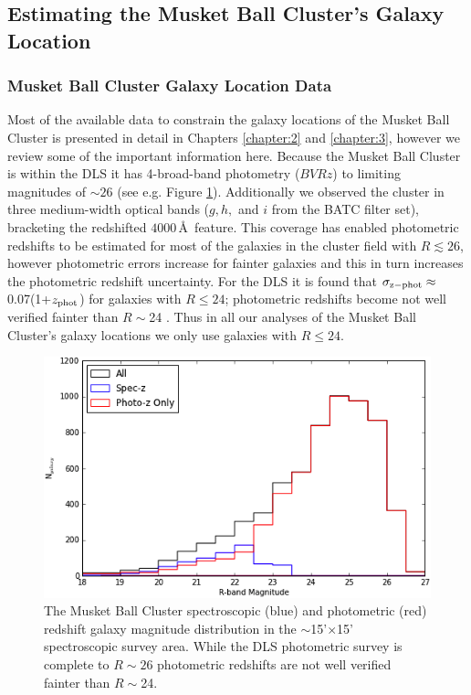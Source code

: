\subsection{Estimating the Musket Ball Cluster's Galaxy Location}

\subsubsection{Musket Ball Cluster Galaxy Location Data}

Most of the available data to constrain the galaxy locations of the Musket Ball Cluster is presented in detail in Chapters \ref{chapter:2} and \ref{chapter:3}, however we review some of the important information here.
Because the Musket Ball Cluster is within the DLS \citep{Wittman:2002cp} it has 4-broad-band photometry ($BVRz$) to limiting magnitudes of $\sim26$ (see e.g. Figure \ref{figure:PhotozSpeczMagDist}).
Additionally we observed the cluster in three medium-width optical bands ($g,h,$ and $i$ from the BATC filter set), bracketing the redshifted $4000$\,\AA\, feature.
This coverage has enabled photometric redshifts to be estimated for most of the galaxies in the cluster field with $R\lesssim26$, however photometric errors increase for fainter galaxies and this in turn increases the photometric redshift uncertainty.  
For the DLS it is found that $\sigma_{\rm z-phot}\approx$0.07(1+$z_{\rm phot}$) for galaxies with $R\leq24$; photometric redshifts become not well verified fainter than $R\sim$24 \citep{Schmidt:2013ig}.
Thus in all our analyses of the Musket Ball Cluster's galaxy locations we only use galaxies with $R\leq24$.

\begin{figure}
	\centering
	\includegraphics[width=5in]{Chapter4/AnalysisFiles/magdist.png}
	\caption[Musket Ball Cluster spectroscopic and photometric magnitude distribution.]{
	The Musket Ball Cluster spectroscopic (blue) and photometric (red) redshift galaxy magnitude distribution in the $\sim$15'$\times$15' spectroscopic survey area.
	While the DLS photometric survey is complete to $R\sim26$ photometric redshifts are not well verified fainter than $R\sim$24.
		}
	\label{figure:PhotozSpeczMagDist}
\end{figure}

